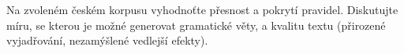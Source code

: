Na zvoleném českém korpusu vyhodnoťte přesnost a pokrytí pravidel. Diskutujte míru, se kterou je možné generovat gramatické věty, a kvalitu textu (přirozené vyjadřování, nezamýšlené vedlejší efekty).

